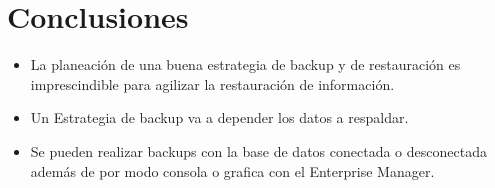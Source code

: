 \documentclass[12pt,letterpaper]{article}
\begin{document}
\newpage 
\section{Conclusiones} 
\begin{itemize}
\item La planeación de una buena estrategia de backup y de restauración es imprescindible para agilizar la restauración de información. \\
\item Un Estrategia de backup va a depender los datos a respaldar. \\
\item Se pueden realizar backups con la base de datos conectada o desconectada además de por modo consola o grafica con el Enterprise Manager. \\
\end{itemize}
\end{document}
